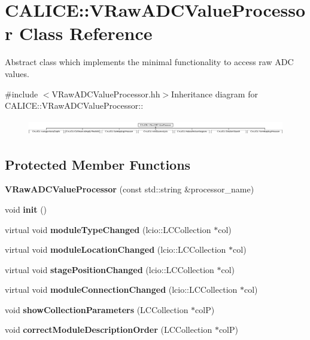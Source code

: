 \section{CALICE::VRawADCValueProcessor Class Reference}
\label{classCALICE_1_1VRawADCValueProcessor}


Abstract class which implements the minimal functionality to access raw ADC values.  


{\ttfamily \#include $<$VRawADCValueProcessor.hh$>$}Inheritance diagram for CALICE::VRawADCValueProcessor::\begin{figure}[H]
\begin{center}
\leavevmode
\includegraphics[height=0.683761cm]{classCALICE_1_1VRawADCValueProcessor}
\end{center}
\end{figure}
\subsection*{Protected Member Functions}
\begin{DoxyCompactItemize}
\item 
{\bfseries VRawADCValueProcessor} (const std::string \&processor\_\-name)\label{classCALICE_1_1VRawADCValueProcessor_aaf1fa3484d50b2a28f96f3ec3853e9cc}

\item 
void {\bfseries init} ()\label{classCALICE_1_1VRawADCValueProcessor_a68246236e2ed3c612b9617234655d2a1}

\item 
virtual void {\bfseries moduleTypeChanged} (lcio::LCCollection $\ast$col)\label{classCALICE_1_1VRawADCValueProcessor_a40c7f7d113fff799c0334c7b773b5513}

\item 
virtual void {\bfseries moduleLocationChanged} (lcio::LCCollection $\ast$col)\label{classCALICE_1_1VRawADCValueProcessor_a11391eed95cf78c653dca943c1444134}

\item 
virtual void {\bfseries stagePositionChanged} (lcio::LCCollection $\ast$col)\label{classCALICE_1_1VRawADCValueProcessor_ac1206e19dae92b34ee26dcbee542c3ab}

\item 
virtual void {\bfseries moduleConnectionChanged} (lcio::LCCollection $\ast$col)\label{classCALICE_1_1VRawADCValueProcessor_af79356a56727b21864897f799b2e98ed}

\item 
void {\bfseries showCollectionParameters} (LCCollection $\ast$colP)\label{classCALICE_1_1VRawADCValueProcessor_a5cd308af8668b39a2dc93eafc1fba03c}

\item 
void {\bfseries correctModuleDescriptionOrder} (LCCollection $\ast$colP)\label{classCALICE_1_1VRawADCValueProcessor_a3f3ae1c5de99f40e5682aa35200d0365}

\end{DoxyCompactItemize}
